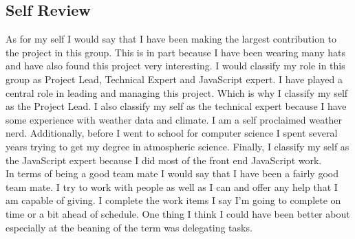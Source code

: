\documentclass[onecolumn, draftclsnofoot,10pt, compsoc]{article}
\begin{document}
	\subsection{Self Review}
	As for my self I would say that I have been making the largest contribution to the project in this group. This is in part because I have been wearing many hats and have also found this project very interesting. I would classify my role in this group as Project Lead, Technical Expert and JavaScript expert. I have played a central role in leading and managing this project. Which is why I classify my self as the Project Lead. I also classify my self as the technical expert because I have some experience with weather data and climate. I am a self proclaimed weather nerd. Additionally, before I went to school for computer science I spent several years trying to get my degree in atmospheric science. Finally, I classify my self as the JavaScript expert because I did most of the front end JavaScript work.\\
	
	In terms of being a good team mate I would say that I have been a fairly good team mate. I try to work with people as well as I can and offer any help that I am capable of giving. I complete the work items I say I'm going to complete on time or a bit ahead of schedule. One thing I think I could have been better about especially at the beaning of the term was delegating tasks.\\
\end{document}
